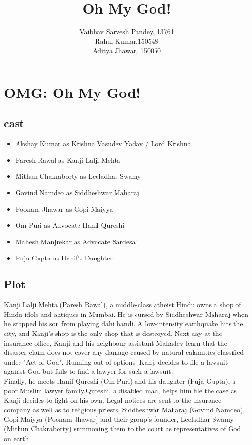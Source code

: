 \documentclass[a4paper]{article}
\title{Oh My God! }
\author{Vaibhav Sarvesh Pandey, 13761\\

	Rahul Kumar,150548\\
	Aditya Jhawar, 150050}
\begin{document}
	\maketitle
	

\section{OMG: Oh My God! }
\subsection{cast}
\begin{itemize}
\item Akshay Kumar as Krishna Vasudev Yadav / Lord Krishna
\item Paresh Rawal as Kanji Lalji Mehta
\item Mithun Chakraborty as Leeladhar Swamy
\item Govind Namdeo as Siddheshwar Maharaj
\item Poonam Jhawar as Gopi Maiyya
\item Om Puri as Advocate Hanif Qureshi
\item Mahesh Manjrekar as Advocate Sardesai
\item Puja Gupta as Hanif's Daughter                 	  
\end{itemize}

\subsection{Plot}
Kanji Lalji Mehta (Paresh Rawal), a middle-class atheist Hindu owns a shop of Hindu idols and antiques in Mumbai. He is cursed by Siddheshwar Maharaj when he stopped his son from playing dahi handi. A low-intensity earthquake hits the city, and Kanji's shop is the only shop that is destroyed. Next day at the insurance office, Kanji and his neighbour-assistant Mahadev learn that the disaster claim does not cover any damage caused by natural calamities classified under "Act of God".   Running out of options, Kanji decides to file a lawsuit against God but fails to find a lawyer for such a lawsuit.\\
	Finally, he meets Hanif Qureshi (Om Puri) and his daughter (Puja Gupta), a poor Muslim lawyer family.Qureshi, a disabled man, helps him file the case as Kanji decides to fight on his own. Legal notices are sent to the insurance company as well as to religious priests, Siddheshwar Maharaj (Govind Namdeo), Gopi Maiyya (Poonam Jhawar) and their group's founder, Leeladhar Swamy (Mithun Chakraborty) summoning them to the court as representatives of God on earth.
\end{document}
